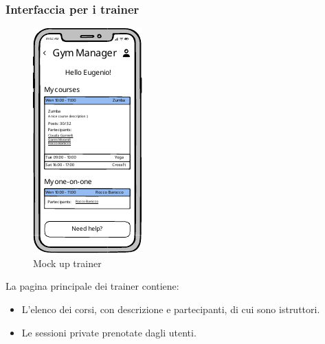 \documentclass{report}
\begin{document}
\subsubsection{Interfaccia per i trainer}
\begin{figure}[h!]
    \centering
    \includegraphics[scale=1.5]{trainer-mockups.pdf}
    \caption{Mock up trainer}
    \label{fig:deathstar}
\end{figure}
\par La pagina principale dei trainer contiene:
\begin{itemize}
    \item L'elenco dei corsi, con descrizione e partecipanti, di cui sono istruttori.
    \item Le sessioni private prenotate dagli utenti.
\end{itemize}
\end{document}
